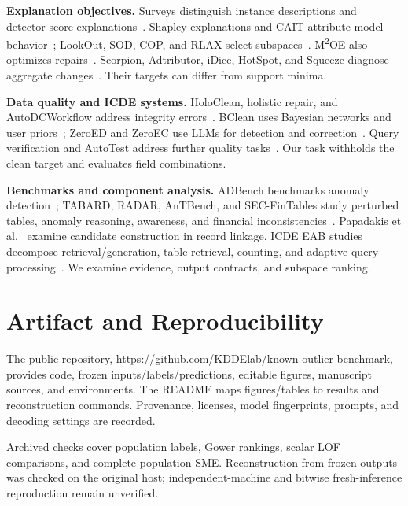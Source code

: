\documentclass[conference]{IEEEtran}
\begin{document}
\textbf{Explanation objectives.} Surveys distinguish instance descriptions and detector-score explanations~\cite{panjei2022survey,li2024xadsurvey}. Shapley explanations and CAIT attribute model behavior~\cite{kluttermann2024shapley,mok2025cait}; LookOut, SOD, COP, and RLAX select subspaces~\cite{gupta2018lookout,kriegel2009sod,amirato2026rlax}. M\textsuperscript{2}OE also optimizes repairs~\cite{angiulli2024m2oe}. Scorpion, Adtributor, iDice, HotSpot, and Squeeze diagnose aggregate changes~\cite{wu2013scorpion,bhagwan2014adtributor,lin2016idice,sun2018hotspot,li2019squeeze}. Their targets can differ from support minima.

\textbf{Data quality and ICDE systems.} HoloClean, holistic repair, and AutoDCWorkflow address integrity errors~\cite{rekatsinas2017holoclean,chu2013holistic,li2025autodcworkflow}. BClean uses Bayesian networks and user priors~\cite{qin2024bclean}; ZeroED and ZeroEC use LLMs for detection and correction~\cite{ni2025zeroed,wu2025zeroec}. Query verification and AutoTest address further quality tasks~\cite{schreiber2026verification,chen2025autotest}. Our task withholds the clean target and evaluates field combinations.

\textbf{Benchmarks and component analysis.} ADBench benchmarks anomaly detection~\cite{han2022adbench}; TABARD, RADAR, AnTBench, and SEC-FinTables study perturbed tables, anomaly reasoning, awareness, and financial inconsistencies~\cite{choudhury2025tabard,gu2025radar,wei2026antbench,ke2026secfintables}. Papadakis et al.~\cite{papadakis2024reevaluation} examine candidate construction in record linkage. ICDE EAB studies decompose retrieval/generation, table retrieval, counting, and adaptive query processing~\cite{zhang2026xrag,yang2026tr360,zhu2026beacon,mu2026aqp}. We examine evidence, output contracts, and subspace ranking.

\section{Artifact and Reproducibility}
The public repository, \url{https://github.com/KDDElab/known-outlier-benchmark}, provides code, frozen inputs/labels/predictions, editable figures, manuscript sources, and environments. The README maps figures/tables to results and reconstruction commands. Provenance, licenses, model fingerprints, prompts, and decoding settings are recorded.

Archived checks cover population labels, Gower rankings, scalar LOF comparisons, and complete-population SME. Reconstruction from frozen outputs was checked on the original host; independent-machine and bitwise fresh-inference reproduction remain unverified.
\end{document}
